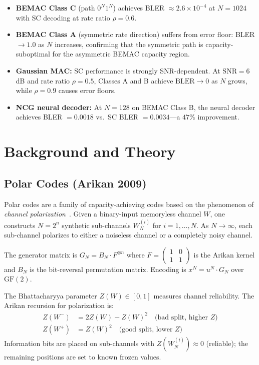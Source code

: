 \documentclass[11pt,a4paper]{article}
\newcommand{\GF}{\mathrm{GF}}
\begin{document}
\begin{itemize}
  \item \textbf{BEMAC Class C} (path $0^N 1^N$) achieves BLER $\approx 2.6 \times 10^{-4}$ at $N = 1024$ with SC decoding at rate ratio $\rho = 0.6$.
  \item \textbf{BEMAC Class A} (symmetric rate direction) suffers from error floor: BLER $\to 1.0$ as $N$ increases, confirming that the symmetric path is capacity-suboptimal for the asymmetric BEMAC capacity region.
  \item \textbf{Gaussian MAC:} SC performance is strongly SNR-dependent. At $\text{SNR} = 6$ dB and rate ratio $\rho = 0.5$, Classes A and B achieve $\text{BLER} \to 0$ as $N$ grows, while $\rho = 0.9$ causes error floors.
  \item \textbf{NCG neural decoder:} At $N = 128$ on BEMAC Class B, the neural decoder achieves BLER $= 0.0018$ vs.\ SC BLER $= 0.0034$---a $47\%$ improvement.
\end{itemize}


\section{Background and Theory}
\label{sec:background}

\subsection{Polar Codes (Arikan 2009)}

Polar codes are a family of capacity-achieving codes based on the phenomenon
of \emph{channel polarization}~\cite{arikan2009}. Given a binary-input
memoryless channel $W$, one constructs $N = 2^n$ synthetic sub-channels
$W_N^{(i)}$ for $i = 1, \ldots, N$. As $N \to \infty$, each sub-channel
polarizes to either a noiseless channel or a completely noisy channel.

The generator matrix is $G_N = B_N \cdot F^{\otimes n}$ where $F = \begin{pmatrix} 1 & 0 \\ 1 & 1 \end{pmatrix}$ is the Arikan kernel and $B_N$ is the
bit-reversal permutation matrix. Encoding is $x^N = u^N \cdot G_N$ over
$\GF(2)$.

The Bhattacharyya parameter $Z(W) \in [0,1]$ measures channel reliability.
The Arikan recursion for polarization is:
\begin{align}
  Z(W^-) &= 2 Z(W) - Z(W)^2 \quad \text{(bad split, higher $Z$)} \\
  Z(W^+) &= Z(W)^2 \quad \text{(good split, lower $Z$)}
\end{align}
Information bits are placed on sub-channels with $Z(W_N^{(i)}) \approx 0$
(reliable); the remaining positions are set to known frozen values.
\end{document}
